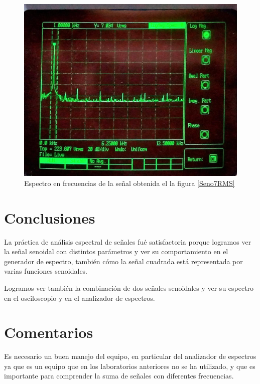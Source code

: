 \documentclass{article}
\begin{document}
\begin{figure}[h!]
    \centering
    \includegraphics[scale=0.15]{Imagenes/FrecSenPur.jpg}
    \caption{Espectro en frecuencias de la señal obtenida el la figura \ref{Seno7RMS}}
    \label{fig:frecuenciasSeno}
\end{figure}



\section{Conclusiones}

La práctica de análisis espectral de señales fué satisfactoria porque logramos ver la señal senoidal con distintos parámetros y ver su comportamiento en el generador de espectro, también cómo la señal cuadrada está representada por varias funciones senoidales.

Logramos ver también la combinación de dos señales senoidales y ver su espectro en el osciloscopio y en el analizador de espectros.

\section{Comentarios}

Es necesario un buen manejo del equipo, en particular del analizador de espectros ya que es un equipo que en los laboratorios anteriores no se ha utilizado, y que es importante para comprender la suma de señales con diferentes frecuencias.



\end{document}
